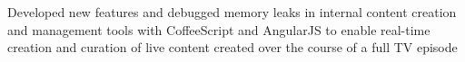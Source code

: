\begin{job}

  \begin{accomplishments}
    \item Developed new features and debugged memory leaks in internal content
    creation and management tools with CoffeeScript and AngularJS to enable
    real-time creation and curation of live content created over the course of a
    full TV episode
  \end{accomplishments}
\end{job}
